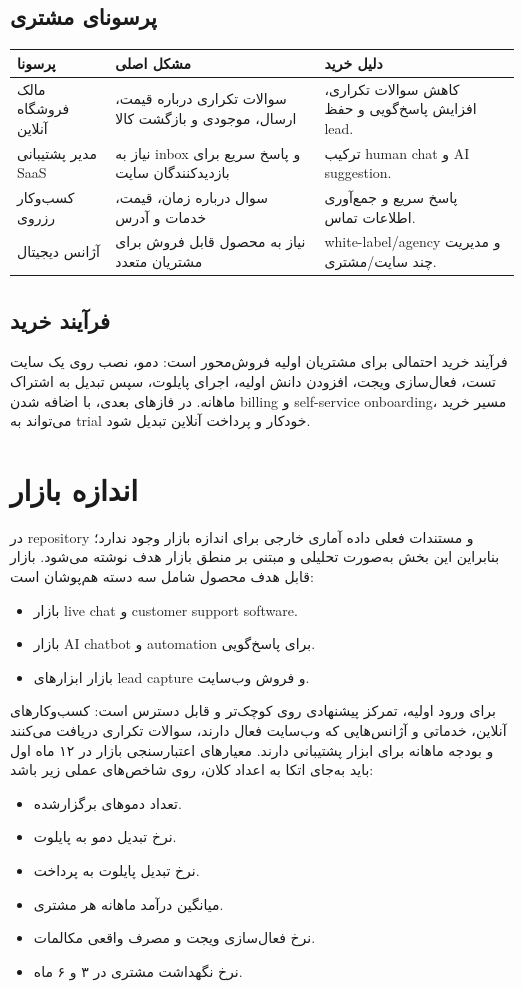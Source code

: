 \documentclass[12pt,a4paper]{article}
\newcommand{\en}[1]{\lr{#1}}
\begin{document}
\subsection{پرسونای مشتری}
\begin{longtable}{R{36mm} R{48mm} R{58mm}}
\toprule
\textbf{پرسونا} & \textbf{مشکل اصلی} & \textbf{دلیل خرید} \\
\midrule
\endhead
مالک فروشگاه آنلاین & سوالات تکراری درباره قیمت، ارسال، موجودی و بازگشت کالا & کاهش سوالات تکراری، افزایش پاسخ‌گویی و حفظ lead. \\
مدیر پشتیبانی SaaS & نیاز به inbox و پاسخ سریع برای بازدیدکنندگان سایت & ترکیب human chat و AI suggestion. \\
کسب‌وکار رزروی & سوال درباره زمان، قیمت، خدمات و آدرس & پاسخ سریع و جمع‌آوری اطلاعات تماس. \\
آژانس دیجیتال & نیاز به محصول قابل فروش برای مشتریان متعدد & white-label/agency و مدیریت چند سایت/مشتری. \\
\bottomrule
\end{longtable}

\subsection{فرآیند خرید}
فرآیند خرید احتمالی برای مشتریان اولیه فروش‌محور است: دمو، نصب روی یک سایت تست، فعال‌سازی ویجت، افزودن دانش اولیه، اجرای پایلوت، سپس تبدیل به اشتراک ماهانه. در فازهای بعدی، با اضافه شدن billing و self-service onboarding، مسیر خرید می‌تواند به trial خودکار و پرداخت آنلاین تبدیل شود.

\section{اندازه بازار}
در repository و مستندات فعلی داده آماری خارجی برای اندازه بازار وجود ندارد؛ بنابراین این بخش به‌صورت تحلیلی و مبتنی بر منطق بازار هدف نوشته می‌شود. بازار قابل هدف محصول شامل سه دسته هم‌پوشان است:
\begin{itemize}
  \item بازار live chat و customer support software.
  \item بازار AI chatbot و automation برای پاسخ‌گویی.
  \item بازار ابزارهای lead capture و فروش وب‌سایت.
\end{itemize}

برای ورود اولیه، تمرکز پیشنهادی روی \en{SAM} کوچک‌تر و قابل دسترس است: کسب‌وکارهای آنلاین، خدماتی و آژانس‌هایی که وب‌سایت فعال دارند، سوالات تکراری دریافت می‌کنند و بودجه ماهانه برای ابزار پشتیبانی دارند. معیارهای اعتبارسنجی بازار در ۱۲ ماه اول باید به‌جای اتکا به اعداد کلان، روی شاخص‌های عملی زیر باشد:
\begin{itemize}
  \item تعداد دموهای برگزارشده.
  \item نرخ تبدیل دمو به پایلوت.
  \item نرخ تبدیل پایلوت به پرداخت.
  \item میانگین درآمد ماهانه هر مشتری.
  \item نرخ فعال‌سازی ویجت و مصرف واقعی مکالمات.
  \item نرخ نگهداشت مشتری در ۳ و ۶ ماه.
\end{itemize}
\end{document}
